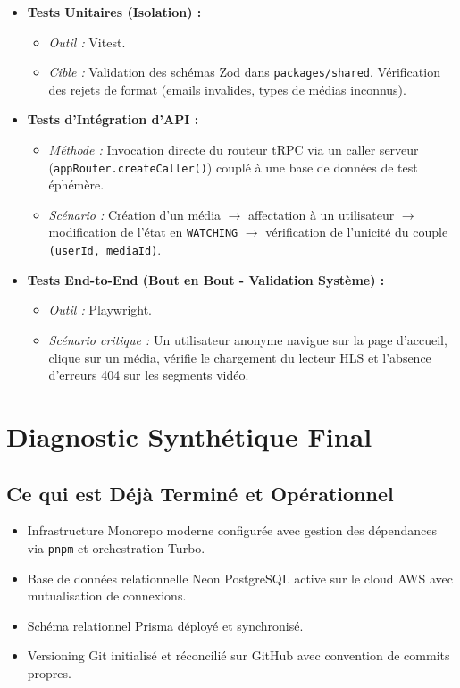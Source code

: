 \documentclass[11pt,a4paper]{article}
\begin{document}
\begin{itemize}
    \item \textbf{Tests Unitaires (Isolation) :}
    \begin{itemize}
        \item \emph{Outil :} Vitest.
        \item \emph{Cible :} Validation des schémas Zod dans \texttt{packages/shared}. Vérification des rejets de format (emails invalides, types de médias inconnus).
    \end{itemize}
    \item \textbf{Tests d'Intégration d'API :}
    \begin{itemize}
        \item \emph{Méthode :} Invocation directe du routeur tRPC via un caller serveur (\texttt{appRouter.createCaller()}) couplé à une base de données de test éphémère.
        \item \emph{Scénario :} Création d'un média $\to$ affectation à un utilisateur $\to$ modification de l'état en \texttt{WATCHING} $\to$ vérification de l'unicité du couple \texttt{(userId, mediaId)}.
    \end{itemize}
    \item \textbf{Tests End-to-End (Bout en Bout - Validation Système) :}
    \begin{itemize}
        \item \emph{Outil :} Playwright.
        \item \emph{Scénario critique :} Un utilisateur anonyme navigue sur la page d'accueil, clique sur un média, vérifie le chargement du lecteur HLS et l'absence d'erreurs 404 sur les segments vidéo.
    \end{itemize}
\end{itemize}

\section{Diagnostic Synthétique Final}

\subsection{Ce qui est Déjà Terminé et Opérationnel}
\begin{itemize}
    \item Infrastructure Monorepo moderne configurée avec gestion des dépendances via \texttt{pnpm} et orchestration Turbo.
    \item Base de données relationnelle Neon PostgreSQL active sur le cloud AWS avec mutualisation de connexions.
    \item Schéma relationnel Prisma déployé et synchronisé.
    \item Versioning Git initialisé et réconcilié sur GitHub avec convention de commits propres.
\end{itemize}
\end{document}
